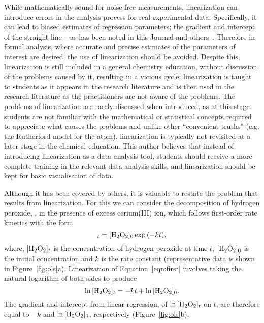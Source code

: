 \documentclass[journal=jceda8,manuscript=article]{achemso}
\begin{document}
While mathematically sound for noise-free measurements, linearization can introduce errors in the analysis process for real experimental data. 
Specifically, it can lead to biased estimates of regression parameters; the gradient and intercept of the straight line -- as has been noted in this Journal and others~\cite{delevie_when_1986,rusling_minimizing_1988,zielinski_least_1997,denton_analysis_2000,levent_dont_2004,rittenhouse_chapter_2005,perrin_linear_2017,moeglich_open_2018,alamillo_mechanistic_2022}.
Therefore in formal analysis, where accurate and precise estimates of the parameters of interest are desired, the use of linearization should be avoided. 
Despite this, linearization is still included in a general chemistry education, without discussion of the problems caused by it, resulting in a vicious cycle; linearization is taught to students as it appears in the research literature and is then used in the research literature as the practitioners are not aware of the problems. 
The problems of linearization are rarely discussed when introduced, as at this stage students are not familiar with the mathematical or statistical concepts required to appreciate what causes the problems and unlike other ``convenient truths'' (e.g. the Rutherford model for the atom), linearization is typically not revisited at a later stage in the chemical education. 
This author believes that instead of introducing linearization as a data analysis tool, students should receive a more complete training in the relevant data analysis skills, and linearization should be kept for basic visualisation of data.

Although it has been covered by others, it is valuable to restate the problem that results from linearization.
For this we can consider the decomposition of hydrogen peroxide, , in the presence of excess cerium(III) ion, which follows first-order rate kinetics with the form~\cite{monk_math_2010}
%
\begin{equation}
    [\ce{H2O2}]_t = [\ce{H2O2}]_0\exp{(-kt)},
    \label{eqn:first}
\end{equation}
%
where, $[\ce{H2O2}]_t$ is the concentration of hydrogen peroxide at time $t$, $[\ce{H2O2}]_0$ is the initial concentration and $k$ is the rate constant (representative data is shown in Figure~\ref{fig:ols}a).
Linearization of Equation~\ref{eqn:first} involves taking the natural logarithm of both sides to produce
%
\begin{equation}
    \ln{[\ce{H2O2}]_t} = -kt + \ln{[\ce{H2O2}]_0}.
    \label{eqn:log}
\end{equation}
%
The gradient and intercept from linear regression, of $\ln{[\ce{H2O2}]_t}$ on $t$, are therefore equal to $-k$ and $\ln{[\ce{H2O2}]_0}$, respectively (Figure~\ref{fig:ols}b).
\end{document}
